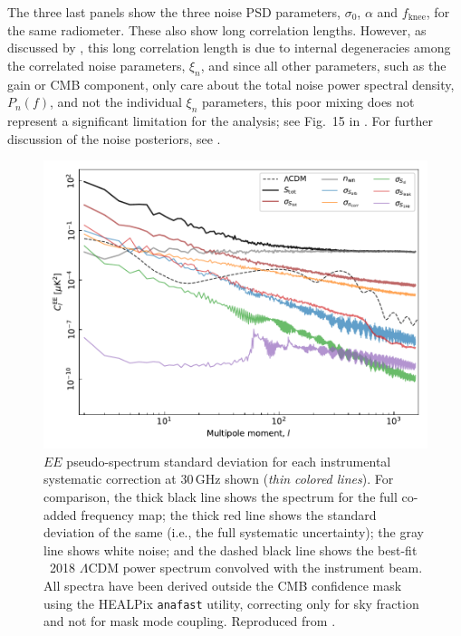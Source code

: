 \documentclass[onecolumn]{aa}
\begin{document}
The three last panels show the three noise PSD parameters, $\sigma_0$,
$\alpha$ and $f_{\mathrm{knee}}$, for the same radiometer. These also
show long correlation lengths. However, as discussed by
\citet{bp04,bp06}, this long correlation length is due to internal
degeneracies among the correlated noise parameters, $\xi_n$, and since
all other parameters, such as the gain or CMB component, only care
about the total noise power spectral density, $P_n(f)$, and not the
individual $\xi_n$ parameters, this poor mixing does not represent a
significant limitation for the analysis; see Fig.~15 in
\citet{bp04}. For further discussion of the noise posteriors, see
\citet{bp06}.

\begin{figure}[t]
  \center
  \includegraphics[width=0.5\linewidth]{figs/30GHz_EE_power_spectra.pdf}
  \caption{$EE$ pseudo-spectrum standard deviation for each
    instrumental systematic correction at 30\,GHz shown (\emph{thin
      colored lines}). For comparison, the thick black line shows the
    spectrum for the full co-added frequency map; the thick red line
    shows the standard deviation of the same (i.e., the full
    systematic uncertainty); the gray line shows white noise; and the
    dashed black line shows the best-fit \Planck\ 2018 $\Lambda$CDM
    power spectrum convolved with the instrument beam. All spectra
    have been derived outside the CMB confidence mask \citep{bp13}
    using the HEALPix \texttt{anafast} utility, correcting only for
    sky fraction and not for mask mode coupling. Reproduced from
    \citep{bp10}. \label{fig:corrmap_powspec_stddev} }
\end{figure}
\end{document}
